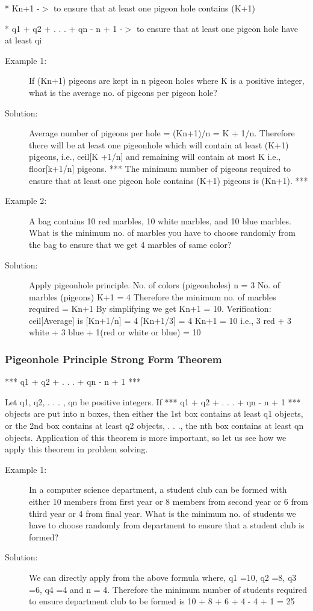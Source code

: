 * Kn+1 -$>$ to ensure that at least one pigeon hole contains (K+1)

* q1 + q2 + . . . + qn - n + 1 -$>$ to ensure that at least one pigeon hole have at least qi

\begin{description}
    \item[Example 1:] If (Kn+1) pigeons are kept in n pigeon holes where K is a positive integer, what is the average no. of pigeons per pigeon hole?
    \item[Solution:] Average number of pigeons per hole = (Kn+1)/n = K + 1/n. Therefore there will be at least one pigeonhole which will contain at least (K+1) pigeons, i.e., ceil[K +1/n] and remaining will contain at most K i.e., floor[k+1/n] pigeons. *** The minimum number of pigeons required to ensure that at least one pigeon hole contains (K+1) pigeons is (Kn+1). ***

    \item[Example 2:] A bag contains 10 red marbles, 10 white marbles, and 10 blue marbles. What is the minimum no. of marbles you have to choose randomly from the bag to ensure that we get 4 marbles of same color?
    \item[Solution:] Apply pigeonhole principle. No. of colors (pigeonholes) n = 3 No. of marbles (pigeons) K+1 = 4 Therefore the minimum no. of marbles required = Kn+1 By simplifying we get Kn+1 = 10. Verification: ceil[Average] is [Kn+1/n] = 4 [Kn+1/3] = 4 Kn+1 = 10 i.e., 3 red + 3 white + 3 blue + 1(red or white or blue) = 10
\end{description}

\subsubsection*{Pigeonhole Principle Strong Form Theorem}

*** q1 + q2 + . . . + qn - n + 1 ***

Let q1, q2, . . . , qn be positive integers. If *** q1 + q2 + . . . + qn - n + 1 *** objects are put into n boxes, then either the 1st box contains at least q1 objects, or the 2nd box contains at least q2 objects, . . ., the nth box contains at least qn objects. Application of this theorem is more important, so let us see how we apply this theorem in problem solving.

\begin{description}
    \item[Example 1:] In a computer science department, a student club can be formed with either 10 members from first year or 8 members from second year or 6 from third year or 4 from final year. What is the minimum no. of students we have to choose randomly from department to ensure that a student club is formed?
    \item[Solution:] We can directly apply from the above formula where, q1 =10, q2 =8, q3 =6, q4 =4 and n = 4. Therefore the minimum number of students required to ensure department club to be formed is 10 + 8 + 6 + 4 - 4 + 1 = 25
\end{description}